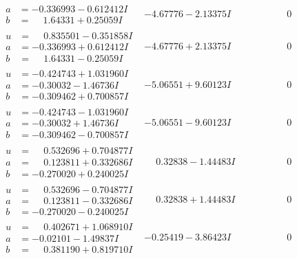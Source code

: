 \documentclass[1p]{elsarticle_modified}
\theoremstyle{definition}
\begin{document}
$$\begin{array}{c|c|c}
\begin{aligned}
a &= -0.336993 - 0.612412 I \\
b &= \phantom{-}1.64331 + 0.25059 I\end{aligned}
 & -4.67776 - 2.13375 I & \phantom{-0.000000 } 0 \\ \hline\begin{aligned}
u &= \phantom{-}0.835501 - 0.351858 I \\
a &= -0.336993 + 0.612412 I \\
b &= \phantom{-}1.64331 - 0.25059 I\end{aligned}
 & -4.67776 + 2.13375 I & \phantom{-0.000000 } 0 \\ \hline\begin{aligned}
u &= -0.424743 + 1.031960 I \\
a &= -0.30032 - 1.46736 I \\
b &= -0.309462 + 0.700857 I\end{aligned}
 & -5.06551 + 9.60123 I & \phantom{-0.000000 } 0 \\ \hline\begin{aligned}
u &= -0.424743 - 1.031960 I \\
a &= -0.30032 + 1.46736 I \\
b &= -0.309462 - 0.700857 I\end{aligned}
 & -5.06551 - 9.60123 I & \phantom{-0.000000 } 0 \\ \hline\begin{aligned}
u &= \phantom{-}0.532696 + 0.704877 I \\
a &= \phantom{-}0.123811 + 0.332686 I \\
b &= -0.270020 + 0.240025 I\end{aligned}
 & \phantom{-}0.32838 - 1.44483 I & \phantom{-0.000000 } 0 \\ \hline\begin{aligned}
u &= \phantom{-}0.532696 - 0.704877 I \\
a &= \phantom{-}0.123811 - 0.332686 I \\
b &= -0.270020 - 0.240025 I\end{aligned}
 & \phantom{-}0.32838 + 1.44483 I & \phantom{-0.000000 } 0 \\ \hline\begin{aligned}
u &= \phantom{-}0.402671 + 1.068910 I \\
a &= -0.02101 - 1.49837 I \\
b &= \phantom{-}0.381190 + 0.819710 I\end{aligned}
 & -0.25419 - 3.86423 I & \phantom{-0.000000 } 0 \\ \hline\begin{aligned}

\end{aligned}
\end{array}$$
\end{document}
